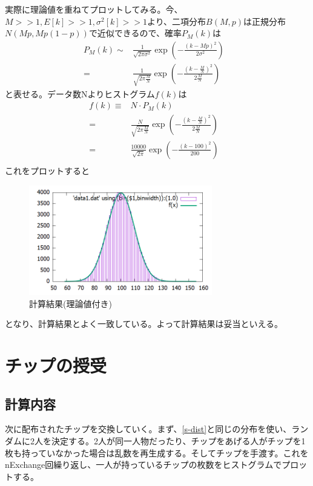\documentclass[ %
  platex,%
  papersize,%
  twocolumn,
  landscape
]{jsarticle}
\begin{document}
実際に理論値を重ねてプロットしてみる。今、$M>>1,E[k]>>1,\sigma^{2}[k]>>1$より、二項分布$B(M,p)$は正規分布$N\left(Mp,Mp(1-p)\right)$で近似できるので、確率$P_M(k)$は
\begin{align}
  P_M(k)\sim&\frac{1}{\sqrt{2\pi\sigma^2}}\exp\left(-\frac{(k-Mp)^2}{2\sigma^2}\right)&\\
  =&\frac{1}{\sqrt{2\pi\frac{M}{N}}}\exp\left({-\frac{(k-\frac{M}{N})^2}{2\frac{M}{N}}}\right)&
\end{align}
と表せる。データ数Nよりヒストグラム$f(k)$は
\begin{align}
  f(k)\equiv&N\cdot P_M(k)&\\
  =&\frac{N}{\sqrt{2\pi\frac{M}{N}}}\exp\left({-\frac{(k-\frac{M}{N})^2}{2\frac{M}{N}}}\right)&\\
  =&\frac{10000}{\sqrt{2\pi}}\exp\left(-\frac{(k-100)^2}{200}\right)&\\
\end{align}
これをプロットすると
\begin{figure}[H]
\begin{center}
\includegraphics[width=8cm]{../cpp/out/dice_game/data1_with_theory.png}
\end{center}
\caption{計算結果(理論値付き)}
\end{figure}
となり、計算結果とよく一致している。よって計算結果は妥当といえる。

\section{チップの授受}\label{s-exchange}
\subsection{計算内容}
次に配布されたチップを交換していく。まず、\ref{s-dist}と同じの分布を使い、ランダムに2人を決定する。2人が同一人物だったり、チップをあげる人がチップを1枚も持っていなかった場合は乱数を再生成する。そしてチップを手渡す。これをnExchange回繰り返し、一人が持っているチップの枚数をヒストグラムでプロットする。
\end{document}
